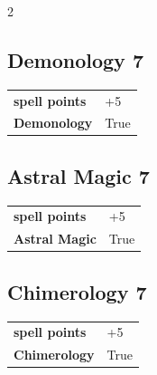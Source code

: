 \begin{multicols}{2}
\begin{tcolorbox}
    \subsection*{Demonology \hfill \small{7 }}
    \tcblower




\begin{tabular}{@{}ll@{}}
    \textbf{spell points} & +5\\
    \textbf{Demonology} & True\\
\end{tabular}


\end{tcolorbox}

\begin{tcolorbox}
    \subsection*{Astral Magic \hfill \small{7 }}
    \tcblower




\begin{tabular}{@{}ll@{}}
    \textbf{spell points} & +5\\
    \textbf{Astral Magic} & True\\
\end{tabular}


\end{tcolorbox}

\begin{tcolorbox}
    \subsection*{Chimerology \hfill \small{7 }}
    \tcblower




\begin{tabular}{@{}ll@{}}
    \textbf{spell points} & +5\\
    \textbf{Chimerology} & True\\
\end{tabular}



\end{tcolorbox}
\end{multicols}
